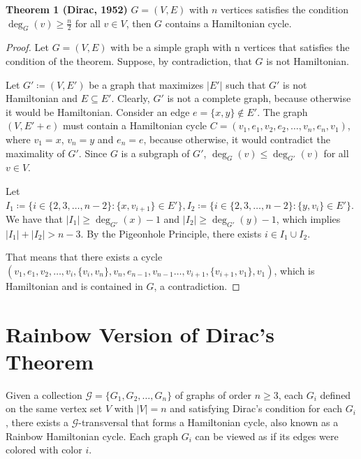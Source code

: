 \textbf{Theorem 1 (Dirac, 1952)} $G = (V, E)$ with $n$ vertices satisfies the condition $\deg_G(v) \geq \frac{n}{2}$ for all $v \in V$, 
then $G$ contains a Hamiltonian cycle.

\begin{proof}
    Let $G = (V, E)$ with be a simple graph with n vertices that satisfies the condition of the theorem. Suppose, 
    by contradiction, that $G$ is not Hamiltonian. 

    Let $G' \coloneqq (V, E')$ be a graph that maximizes $|E'|$ such that $G'$ is not Hamiltonian and $E \subseteq E'$. 
    Clearly, $G'$ is not a complete graph, because otherwise it would be Hamiltonian. Consider an edge $e = \{x, y\} \not\in E'$.
    The graph $(V, E' + e)$ must contain a Hamiltonian cycle $C = (v_1, e_1, v_2, e_2, \ldots, v_n, e_{n}, v_1)$, where 
    $v_1 = x$, $v_n = y$ and $e_n = e$, because otherwise, it would contradict the maximality of $G'$.
    Since $G$ is a subgraph of $G'$, $\deg_G(v) \leq \deg_{G'}(v)$ for all $v \in V$.

    Let $I_1 \coloneqq \{i \in \{2, 3, \dots, n-2\} : \{x, v_{i+1}\} \in E'\}, 
    I_2 \coloneqq \{ i \in \{2, 3, \dots, n - 2\} : \{y, v_{i}\} \in E' \}$.
    We have that $|I_1| \geq \deg_{G'}(x) - 1$ and $|I_2| \geq \deg_{G'}(y) - 1$,
    which implies $|I_1| + |I_2| > n - 3$. By the Pigeonhole Principle, there exists $i \in I_1 \cup I_2$.

    That means that there exists a cycle 
    $(v_1, e_1, v_2, \dots, v_i, \{v_i, v_n\}, v_n, e_{n - 1}, v_{n-1} \dots , v_{i+1}, \{v_{i+1}, v_1\}, v_1)$, 
    which is Hamiltonian and is contained in $G$, a contradiction.

\end{proof}

\section{Rainbow Version of Dirac's Theorem}

Given a collection $\mathcal{G} = \{G_1, G_2, \ldots, G_n\}$ of graphs of order $n \geq 3$, each $G_i$ defined
on the same vertex set $V$ with $|V| = n$ and satisfying Dirac's condition for each $G_i$, there exists a 
$\mathcal{G}$-transversal that forms a Hamiltonian cycle, also known as a Rainbow Hamiltonian cycle.
Each graph $G_i$ can be viewed as if its edges were colored with color $i$.